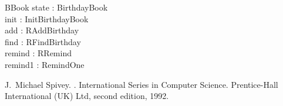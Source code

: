 \documentclass{article}
\begin{document}
\begin{schema}{BBook}
    state   : BirthdayBook \\
    init    : InitBirthdayBook \\
    add     : RAddBirthday \\
    find    : RFindBirthday \\
    remind  : RRemind \\
    remind1 : RemindOne
\end{schema}


% 

\begin{thebibliography}{1}
J.~Michael Spivey.
.
\newblock International Series in Computer Science. Prentice-Hall International
  (UK) Ltd, second edition, 1992.
\end{thebibliography}
\end{document}
